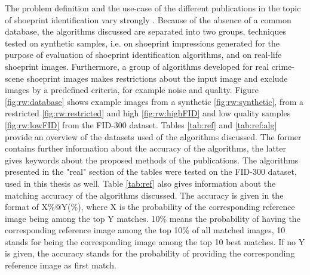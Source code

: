 \documentclass[draft,final]{vutinfth} %
\begin{document}
\par
The problem definition and the use-case of the different publications in the topic of shoeprint identification vary strongly \cite{rida2019forensic}.
Because of the absence of a common database, the algorithms discussed are separated into two groups, techniques tested on synthetic samples, i.e. on shoeprint impressions generated for the purpose of evaluation of shoeprint identification algorithms, and on real-life shoeprint images.
Furthermore, a group of algorithms developed for real crime-scene shoeprint images makes restrictions about the input image and exclude images by a predefined criteria, for example noise and quality.
Figure \ref{fig:rw:database} shows example images from a synthetic \ref{fig:rw:synthetic}, from a restricted \ref{fig:rw:restricted} and high \ref{fig:rw:highFID} and low quality samples \ref{fig:rw:lowFID} from the FID-300 dataset.
Tables \ref{tab:ref} and \ref{tab:ref:alg} provide an overview of the datasets used of the algorithms discussed.
The former contains further information about the accuracy of the algorithms, the latter gives keywords about the proposed methods of the publications.
The algorithms presented in the "real" section of the tables were tested on the FID-300 dataset, used in this thesis as well.
Table \ref{tab:ref} also gives information about the matching accuracy of the algorithms discussed.
The accuracy is given in the format of X\%@Y(\%), where X is the probability of the corresponding reference image being among the top Y matches. 
10\% means the probability of having the corresponding reference image among the top 10\% of all matched images, 10 stands for being the corresponding image among the top 10 best matches.
If no Y is given, the accuracy stands for the probability of providing the corresponding reference image as first match.
\end{document}
